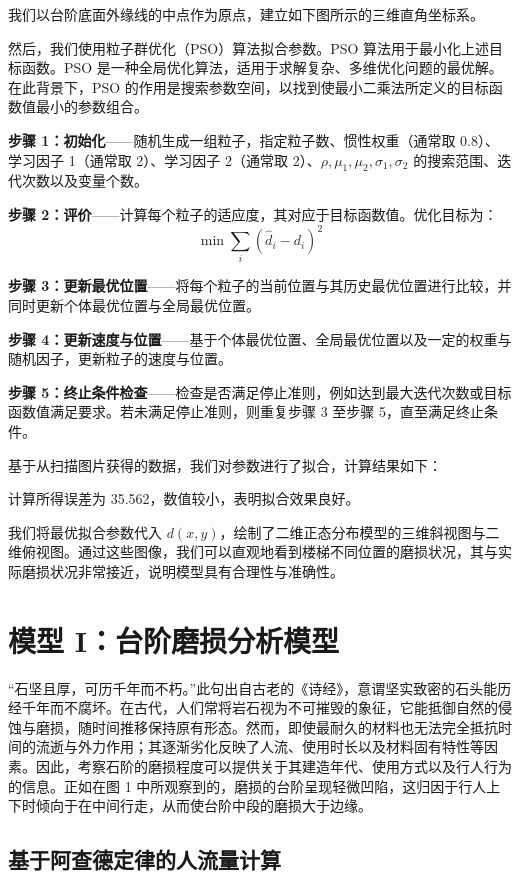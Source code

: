 \documentclass[11pt,a4paper]{ctexart}
\begin{document}
我们以台阶底面外缘线的中点作为原点，建立如下图所示的三维直角坐标系。

然后，我们使用粒子群优化（PSO）算法拟合参数。PSO 算法用于最小化上述目标函数。PSO 是一种全局优化算法，适用于求解复杂、多维优化问题的最优解。在此背景下，PSO 的作用是搜索参数空间，以找到使最小二乘法所定义的目标函数值最小的参数组合。

\textbf{步骤 1：初始化}——随机生成一组粒子，指定粒子数、惯性权重（通常取 0.8）、学习因子 1（通常取 2）、学习因子 2（通常取 2）、$\rho,\mu_1,\mu_2,\sigma_1,\sigma_2$ 的搜索范围、迭代次数以及变量个数。

\textbf{步骤 2：评价}——计算每个粒子的适应度，其对应于目标函数值。优化目标为：
\[
\min \sum_i \left(\hat d_i-d_i\right)^2
\]

\textbf{步骤 3：更新最优位置}——将每个粒子的当前位置与其历史最优位置进行比较，并同时更新个体最优位置与全局最优位置。

\textbf{步骤 4：更新速度与位置}——基于个体最优位置、全局最优位置以及一定的权重与随机因子，更新粒子的速度与位置。

\textbf{步骤 5：终止条件检查}——检查是否满足停止准则，例如达到最大迭代次数或目标函数值满足要求。若未满足停止准则，则重复步骤 3 至步骤 5，直至满足终止条件。

基于从扫描图片获得的数据，我们对参数进行了拟合，计算结果如下：

计算所得误差为 35.562，数值较小，表明拟合效果良好。

我们将最优拟合参数代入 $d(x,y)$，绘制了二维正态分布模型的三维斜视图与二维俯视图。通过这些图像，我们可以直观地看到楼梯不同位置的磨损状况，其与实际磨损状况非常接近，说明模型具有合理性与准确性。

\section{模型 I：台阶磨损分析模型}

“石坚且厚，可历千年而不朽。”此句出自古老的《诗经》，意谓坚实致密的石头能历经千年而不腐坏。在古代，人们常将岩石视为不可摧毁的象征，它能抵御自然的侵蚀与磨损，随时间推移保持原有形态。然而，即使最耐久的材料也无法完全抵抗时间的流逝与外力作用；其逐渐劣化反映了人流、使用时长以及材料固有特性等因素。因此，考察石阶的磨损程度可以提供关于其建造年代、使用方式以及行人行为的信息。正如在图 1 中所观察到的，磨损的台阶呈现轻微凹陷，这归因于行人上下时倾向于在中间行走，从而使台阶中段的磨损大于边缘。

\subsection{基于阿查德定律的人流量计算}
\end{document}
